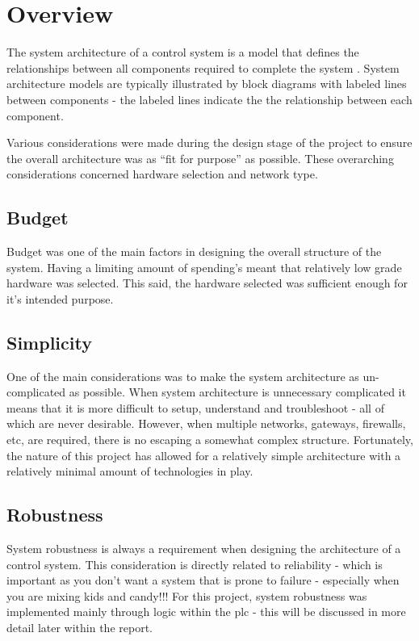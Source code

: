 \section{Overview}
    The system architecture of a control system is a model that defines the relationships between all  components required to complete the system \remCite. System architecture models are typically illustrated by block diagrams with labeled lines between components - the labeled lines indicate the the relationship between each component. 

    Various considerations were made during the design stage of the project to ensure the overall architecture was as “fit for purpose” as possible. These overarching considerations concerned hardware selection and network type.

    \subsection{Budget}
        Budget was one of the main factors in designing the overall structure of the system. Having a limiting amount of spending's meant that relatively low grade hardware was selected. This said, the hardware selected was sufficient enough for it’s intended purpose.

    \subsection{Simplicity}
        One of the main considerations was to make the system architecture as un-complicated as possible. When system architecture is unnecessary complicated it means that it is more difficult to setup, understand and troubleshoot - all of which are never desirable. However, when multiple networks, gateways, firewalls, etc, are required, there is no escaping a somewhat complex structure. Fortunately, the nature of this project has allowed for a relatively simple architecture with a relatively minimal amount of technologies in play.
    
    \subsection{Robustness}
        System robustness is always a requirement when designing the architecture of a control system. This consideration is directly related to reliability - which is important as you don’t want a system that is prone to failure - especially when you are mixing kids and candy!!! For this project, system robustness was implemented mainly through logic within the \acrshort{plc} - this will be discussed in more detail later within the report. 
    
